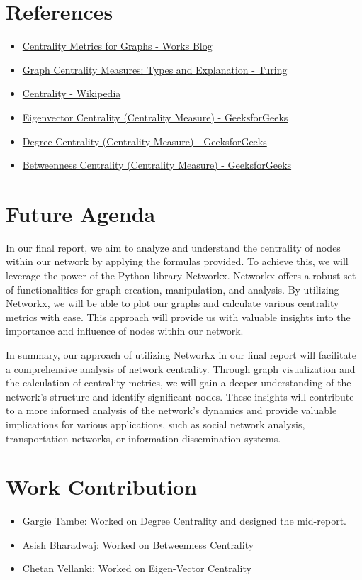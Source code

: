 \documentclass{article}
\begin{document}
\section*{References}

\begin{itemize}
    \item \href{https://www.works.so/blog/developers/centrality-metrics-for-graphs}{Centrality Metrics for Graphs - Works Blog}
    \item \href{https://www.turing.com/kb/graph-centrality-measures}{Graph Centrality Measures: Types and Explanation - Turing}
    \item \href{https://en.wikipedia.org/wiki/Centrality}{Centrality - Wikipedia}
    \item \href{https://www.geeksforgeeks.org/eigenvector-centrality-centrality-measure/}{Eigenvector Centrality (Centrality Measure) - GeeksforGeeks}
    \item \href{https://www.geeksforgeeks.org/degree-centrality-centrality-measure/}{Degree Centrality (Centrality Measure) - GeeksforGeeks}
    \item \href{https://www.geeksforgeeks.org/betweenness-centrality-centrality-measure/}{Betweenness Centrality (Centrality Measure) - GeeksforGeeks}
\end{itemize}

\section*{Future Agenda}

In our final report, we aim to analyze and understand the centrality of nodes within our network by applying the formulas provided. To achieve this, we will leverage the power of the Python library Networkx. Networkx offers a robust set of functionalities for graph creation, manipulation, and analysis. By utilizing Networkx, we will be able to plot our graphs and calculate various centrality metrics with ease. This approach will provide us with valuable insights into the importance and influence of nodes within our network. 

In summary, our approach of utilizing Networkx in our final report will facilitate a comprehensive analysis of network centrality. Through graph visualization and the calculation of centrality metrics, we will gain a deeper understanding of the network's structure and identify significant nodes. These insights will contribute to a more informed analysis of the network's dynamics and provide valuable implications for various applications, such as social network analysis, transportation networks, or information dissemination systems.

\section*{Work Contribution}

\begin{itemize}
    \item Gargie Tambe: Worked on Degree Centrality and designed the mid-report. 
    \item Asish Bharadwaj: Worked on Betweenness Centrality
    \item Chetan Vellanki: Worked on Eigen-Vector Centrality
\end{itemize}
\end{document}
